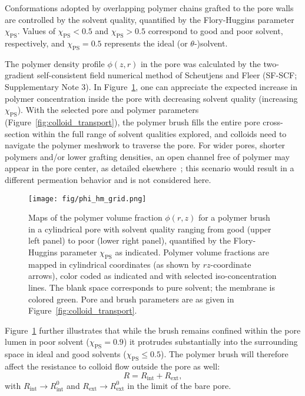 \documentclass[12pt, a4paper]{article}
\newcommand{\todo}[1]{\pdfcomment{#1}} %
\begin{document}
Conformations adopted by overlapping polymer chains grafted to the pore walls are controlled by the solvent quality, quantified by the Flory-Huggins parameter $\chi_{\text{PS}}$.
Values of $\chi_{\text{PS}}<0.5$ and $\chi_{\text{PS}}>0.5$ correspond to good and poor solvent, respectively, and $\chi_{\text{PS}}=0.5$ represents the ideal (or $\theta$-)solvent.

The polymer density profile $\phi(z,r)$ in the pore was calculated by the two-gradient self-consistent field numerical method of Scheutjens and Fleer (SF-SCF; Supplementary Note 3).
In Figure~\ref{fig:phi_hm_grid}, one can appreciate the expected increase in polymer concentration inside the pore with decreasing solvent quality (increasing $\chi_{\text{PS}}$).
With the selected pore and polymer parameters (Figure~\ref{fig:colloid_transport}), the polymer brush fills the entire pore cross-section within the full range of solvent qualities explored, and colloids need to navigate the polymer meshwork to traverse the pore.
\todo{ML: Ralf, FL did not like the verb traverse much}
For wider pores, shorter polymers and/or lower grafting densities, an open channel free of polymer may appear in the pore center, as detailed elsewhere~\cite{Ligoure2001,Laktionov2021}; this scenario would result in a different permeation behavior and is not considered here.

\begin{figure}
    \centering
    \texttt{[image: fig/phi\_hm\_grid.png]}
    \caption{
    Maps of the polymer volume fraction $\phi(r,z)$ for a polymer brush in a cylindrical pore with solvent quality ranging from good (upper left panel) to poor (lower right panel), quantified by the Flory-Huggins parameter $\chi_{\text{PS}}$ as indicated.
    Polymer volume fractions are mapped in cylindrical coordinates (as shown by $rz$-coordinate arrows), color coded as indicated and with selected iso-concentration lines. The blank space corresponds to pure solvent; the membrane is colored green.
    Pore and brush parameters are as given in Figure~\ref{fig:colloid_transport}.
    }
    \label{fig:phi_hm_grid}
\end{figure}

Figure~\ref{fig:phi_hm_grid} further illustrates that while the brush remains confined within the pore lumen in poor solvent ($\chi_{\text{PS}}=0.9$) it protrudes substantially into the surrounding space in ideal and good solvents ($\chi_{\text{PS}}\le0.5$).
The polymer brush will therefore affect the resistance to colloid flow outside the pore as well:
\begin{equation}
    R=R_{\text{int}}+R_{\text{ext}},
    \label{eq:R_tot_tot}
\end{equation}
with $R_{\text{int}}\rightarrow R_{\text{int}}^{0}$ and $R_{\text{ext}}\rightarrow R_{\text{ext}}^{0}$ in the limit of the bare pore.
\end{document}
